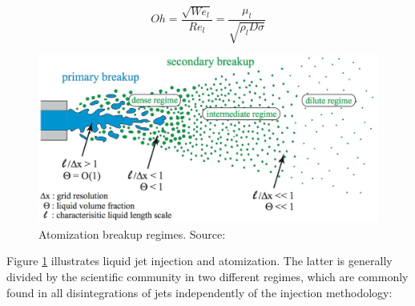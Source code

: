 \begin{equation}
Oh = \frac{\sqrt{We_l}}{Re_l} = \frac{\mu_l}{\sqrt{\rho_l D \sigma}}
\end{equation}

\begin{figure}[h!]
	\centering
	\includegraphics[scale=0.5]{./part0_intro/atomization-regimes-scheme}
	\caption[Atomization breakup regimes]{Atomization breakup regimes. Source: }
	\label{fig:atomization_regimes_herrmann}
\end{figure}

Figure \ref{fig:atomization_regimes_herrmann} illustrates liquid jet injection and atomization. The latter is generally divided by the scientific community in two different regimes, which are commonly found in all disintegrations of jets independently of the injection methodology:

